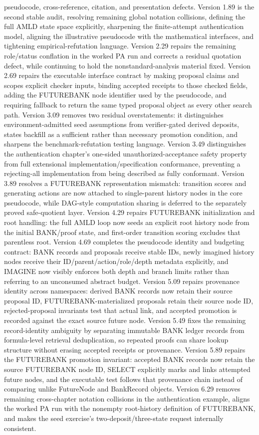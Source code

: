 \documentclass[11pt,openany]{book}
\theoremstyle{definition}
\theoremstyle{remark}
\begin{document}
pseudocode, cross-reference, citation, and presentation defects. Version 1.89 is the second stable audit, resolving remaining global notation collisions, defining the full AMLD state space explicitly, sharpening the finite-attempt authentication model, aligning the illustrative pseudocode with the mathematical interfaces, and tightening empirical-refutation language. Version 2.29 repairs the remaining role/status conflation in the worked PA run and corrects a residual quotation defect, while continuing to hold the nonstandard-analysis material fixed. Version 2.69 repairs the executable interface contract by making proposal claims and scopes explicit checker inputs, binding accepted receipts to those checked fields, adding the FUTUREBANK node identifier used by the pseudocode, and requiring fallback to return the same typed proposal object as every other search path. Version 3.09 removes two residual overstatements: it distinguishes environment-admitted seed assumptions from verifier-gated derived deposits, states backfill as a sufficient rather than necessary promotion condition, and sharpens the benchmark-refutation testing language. Version 3.49 distinguishes the authentication chapter's one-sided unauthorized-acceptance safety property from full extensional implementation/specification conformance, preventing a rejecting-all implementation from being described as fully conformant. Version 3.89 resolves a FUTUREBANK representation mismatch: transition scores and generating actions are now attached to single-parent history nodes in the core pseudocode, while DAG-style computation sharing is deferred to the separately proved safe-quotient layer. Version 4.29 repairs FUTUREBANK initialization and root handling: the full AMLD loop now seeds an explicit root history node from the initial BANK/proof state, and first-order transition scoring excludes that parentless root. Version 4.69 completes the pseudocode identity and budgeting contract: BANK records and proposals receive stable IDs, newly imagined history nodes receive their ID/parent/action/role/depth metadata explicitly, and IMAGINE now visibly enforces both depth and branch limits rather than referring to an unconsumed abstract budget. Version 5.09 repairs provenance identity across namespaces: derived BANK records now retain their source proposal ID, FUTUREBANK-materialized proposals retain their source node ID, rejected-proposal invariants test that actual link, and accepted promotion is recorded against the exact source future node. Version 5.49 fixes the remaining record-identity ambiguity by separating immutable BANK ledger records from formula-level retrieval deduplication, so repeated proofs can share lookup structure without erasing accepted receipts or provenance. Version 5.89 repairs the FUTUREBANK promotion invariant: accepted BANK records now retain the source FUTUREBANK node ID, SELECT explicitly marks and links attempted future nodes, and the executable test follows that provenance chain instead of comparing unlike FutureNode and BankRecord objects. Version 6.29 removes remaining cross-chapter notation collisions in the authentication example, aligns the worked PA run with the nonempty root-history definition of FUTUREBANK, and makes the seed exercise's two-deposit/three-state request internally consistent. 
\end{document}
